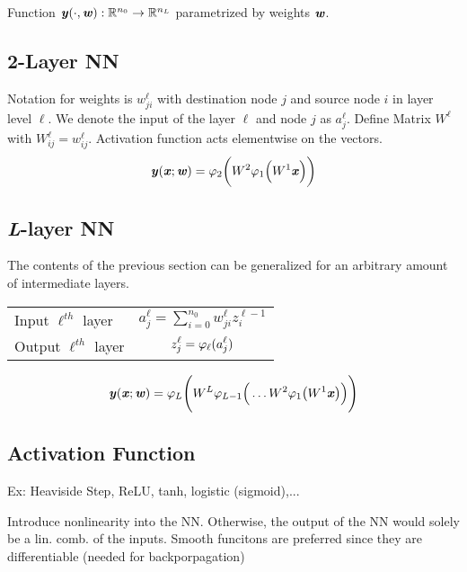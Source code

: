 Function $\textbf{\textit{y}}(\cdot,\textbf{\textit{w}}): \mathbb{R}^{n_0}\rightarrow\mathbb{R}^{n_L}$ parametrized by weights $\textbf{\textit{w}}$.

\subsection{2-Layer NN}
    Notation for weights is $w_{ji}^\ell$ with destination node $j$ and source node $i$ in layer level $\ell$. We denote the input of the layer $\ell$ and node $j$ as $a_j^\ell$.
    Define Matrix $W^\ell$ with $W_{ij}^\ell = w_{ij}^\ell$. Activation function acts elementwise on the vectors.
    \begin{equation*}
        \textbf{\textit{y}}(\textbf{\textit{x}};\textbf{\textit{w}}) = \varphi_2\bigg(W^2\varphi_1\Big(W^1\textbf{\textit{x}}\Big)\bigg)
    \end{equation*}
\subsection{\textit{L}-layer NN}
    The contents of the previous section can be generalized for an arbitrary amount of intermediate layers.
     \begin{center}
            \renewcommand{\arraystretch}{1.3}{\begin{tabular}{l|c}
                Input $\ell^{th}$ layer & $\displaystyle a_j^\ell = \sum_{i=0}^{n_0} w_{ji}^\ell z_i^{\ell - 1}$\\
                Output $\ell^{th}$ layer & $\displaystyle z_j^\ell = \varphi_{\ell}(a_j^\ell)$
            \end{tabular}}
    \end{center}
    \begin{equation*}
        \textbf{\textit{y}}(\textbf{\textit{x}};\textbf{\textit{w}}) = \varphi_L\Bigg(W^L\varphi_{L-1}\Big(\dots W^2\varphi_1\big(W^1\textbf{\textit{x}}\big)\Big)\Bigg)
    \end{equation*}

\subsection{Activation Function}
    Ex: Heaviside Step, ReLU, tanh, logistic (sigmoid),...
    
    Introduce nonlinearity into the NN. Otherwise, the output of the NN would solely be a lin. comb. of the inputs. Smooth funcitons are preferred since they are differentiable (needed for backporpagation)
    
